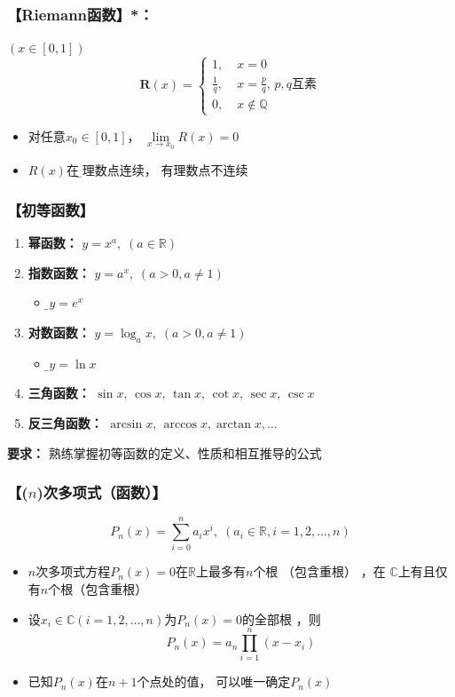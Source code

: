 \subsubsection{\bf 【Riemann函数】*：} 

$(x\in[0,1])$
  $$\bm{R}(x) =\left\{
	\begin{array}{ll}
	1,\;&x=0\\
	\displaystyle\frac 1q,\;&x=\displaystyle\frac pq,\,p,q\mbox{互素}\\
	0,\;&x\notin\mathbb{Q}
	\end{array}
  \right. $$
  \begin{itemize}
    \item 对任意$x_0\in[0,1]$， $\lim\limits_{x\to x_0}R(x)=0$
    \vspace{1ex}
    \item $R(x)$在{\b 无理数点连续， 有理数点不连续}
  \end{itemize}

\subsubsection{【初等函数】}

\begin{enumerate}
  \item {\bf 幂函数：} $y=x^a,\; (a\in\mathbb{R})$
  \item {\bf 指数函数：} $y=a^x,\; (a>0,a\ne 1)$
  \begin{itemize}
    \item {\b $y=e^x$}
  \end{itemize}
  \item {\bf 对数函数：} $y=\log_ax,\; (a>0,a\ne 1)$
  \begin{itemize}
    \item {\b$y=\ln x$}
  \end{itemize}
  \item {\bf 三角函数：} $\sin x, \,\cos x,\, \tan x, \,\cot
  x,\, \sec x,\, \csc x$
  \item {\bf 反三角函数：} $\arcsin x, \,\arccos x, \arctan x,
  \ldots$
\end{enumerate}
{\bf{要求：}} 熟练掌握初等函数的定义、性质和相互推导的公式


\subsubsection{【($n$)次多项式（函数）】}

  $$P_n(x)=\sum_{i=0}^na_ix^i,
  \;(a_i\in\mathbb{R},i=1,2,\ldots,n)$$
  \begin{itemize}
    \item { $n$次多项式方程$P_n(x)=0$在$\mathbb{R}$上最多有$n$个根 （包含重根） ，在
    $\mathbb{C}$上有且仅有$n$个根（包含重根）}
    \item { 设$x_i\in\mathbb{C}(i=1,2,\ldots,n)$为$P_n(x)=0$的全部根 ，则
    $$P_n(x)=a_n\prod_{i=1}^n(x-x_i)$$}
    \item { 已知$P_n(x)$在$n+1$个点处的值， 可以唯一确定$P_n(x)$}
  \end{itemize}

